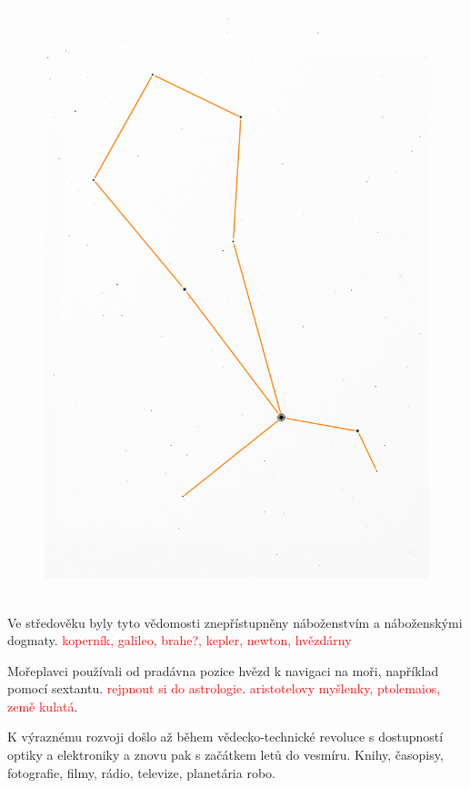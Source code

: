 \documentclass[12pt,a4paper,titlepage]{article}
\begin{document}
\begin{figure}[H]
\begin{minipage}{.45\textwidth}
	  \centering
	  \includegraphics[width=1\linewidth]{2025.png}
	  ~\label{fig:test2}
	\end{minipage}
\end{figure}



Ve středověku byly tyto vědomosti znepřístupněny náboženstvím a náboženskými dogmaty. \textcolor{red}{koperník, galileo, brahe?, kepler, newton, hvězdárny}

Mořeplavci používali od pradávna pozice hvězd k navigaci na moři, například pomocí sextantu. \textcolor{red}{rejpnout si do astrologie}. \textcolor{red}{aristotelovy myšlenky, ptolemaios, země kulatá}.

K výraznému rozvoji došlo až během vědecko-technické revoluce s dostupností optiky a elektroniky a znovu pak s začátkem letů do vesmíru. Knihy, časopisy, fotografie, filmy, rádio, televize, planetária robo.
\end{document}

